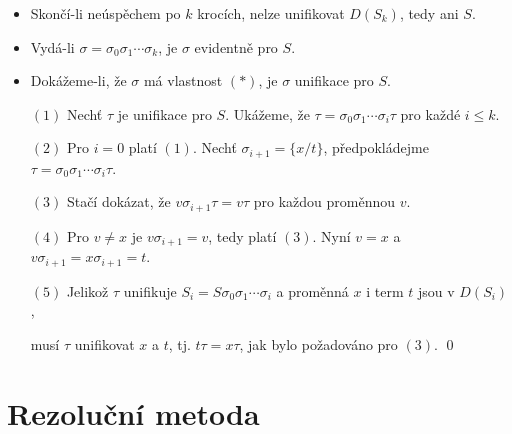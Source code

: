     \begin{itemize}
    \item Skončí-li neúspěchem po $k$ krocích, nelze unifikovat $D(S_k)$, tedy ani $S$.
    \vspace{0.5mm}
    
    \item Vydá-li $\sigma=\sigma_0\sigma_1\cdots\sigma_k$, je $\sigma$ evidentně  pro $S$.
    \vspace{0.5mm}
    
    \item Dokážeme-li, že $\sigma$ má vlastnost $(*)$, je $\sigma$  unifikace pro $S$.
    \vspace{0.5mm}
    
    \item[$(1)$] Nechť $\tau$ je unifikace pro $S$. Ukážeme, že $\tau=\sigma_0\sigma_1\cdots\sigma_i\tau$ pro každé $i\le k$.
    \vspace{0.5mm}
    
    \item[$(2)$] Pro $i=0$ platí $(1)$. Nechť $\sigma_{i+1}=\{x/t\}$, předpokládejme $\tau=\sigma_0\sigma_1\cdots\sigma_i\tau$.
    \vspace{0.5mm}
    
    \item[$(3)$] Stačí dokázat, že $v\sigma_{i+1}\tau=v\tau$ pro každou proměnnou $v$.
    \vspace{0.5mm}
    
    \item[$(4)$] Pro $v\ne x$ je $v\sigma_{i+1}=v$, tedy platí $(3)$. Nyní $v=x$ a $v\sigma_{i+1}=x\sigma_{i+1}=t$.
    \vspace{0.5mm}
    
    \item[$(5)$] Jelikož $\tau$ unifikuje $S_{i}=S\sigma_0\sigma_1\cdots\sigma_i$ a proměnná $x$ i term $t$ jsou v $D(S_{i})$,
    \vspace{0.5mm}
    
    musí $\tau$ unifikovat $x$ a $t$, tj. $t\tau=x\tau$, jak bylo požadováno pro $(3)$. \qed
    \end{itemize}
    
    

\section{Rezoluční metoda}\todo

